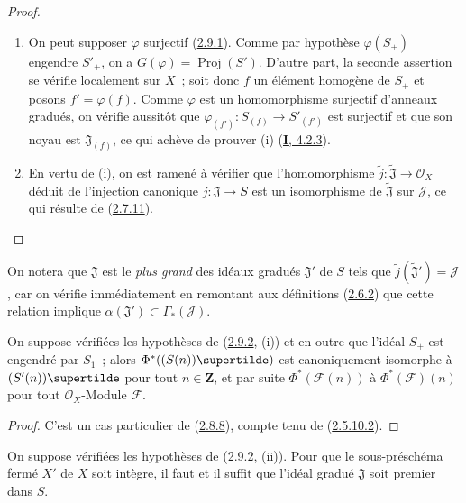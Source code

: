 \begin{proof}
\begin{enumerate}
  \item[\rm(i)] On peut supposer $\varphi$ surjectif
    (\hyperref[II.2.9.1-fr]{2.9.1}). Comme par hypothèse
    $\varphi(S_+)$ engendre $S'_+$, on a
    $G(\varphi)=\operatorname{Proj}(S')$. D'autre part, la seconde assertion
    se vérifie localement sur $X$~; soit donc $f$ un élément homogène de
    $S_+$ et posons $f'=\varphi(f)$. Comme $\varphi$ est un homomorphisme
    surjectif d'anneaux gradués, on vérifie aussitôt que
    $\varphi_{(f')}:S_{(f)}\to S'_{(f')}$ est surjectif et que son noyau est
    $\mathfrak{J}_{(f)}$, ce qui achève de prouver (i)
    (\hyperref[I.4.2.3-fr]{\textbf{I}, 4.2.3}).
  \item[\rm(ii)] En vertu de (i), on est ramené à vérifier que
    l'homomorphisme $\widetilde{j}:\widetilde{\mathfrak{J}}\to\mathcal{O}_X$
    déduit de l'injection canonique $j:\mathfrak{J}\to S$ est un
    isomorphisme de $\widetilde{\mathfrak{J}}$ sur $\mathcal{J}$, ce qui
    résulte de (\hyperref[II.2.7.11-fr]{2.7.11}).
\end{enumerate}
\end{proof}

On notera que $\mathfrak{J}$ est le \emph{plus grand} des idéaux gradués
$\mathfrak{J}'$ de $S$ tels que
$\widetilde{j}(\widetilde{\mathfrak{J}}')=\mathcal{J}$, car on vérifie
immédiatement en remontant aux définitions
(\hyperref[II.2.6.2-fr]{2.6.2}) que cette relation implique
$\alpha(\mathfrak{J}')\subset\Gamma_*(\mathcal{J})$.

\begin{corollary}[2.9.3]
\label{II.2.9.3-fr}
On suppose vérifiées les hypothèses de
\textup{(\hyperref[II.2.9.2-fr]{2.9.2}, (i))} et en outre que l'idéal $S_+$ est
engendré par $S_1$~; alors $\Phi^*((S(n))\supertilde)$ est canoniquement
isomorphe à $(S'(n))\supertilde$ pour tout $n\in\mathbf{Z}$, et par suite
$\Phi^*(\mathcal{F}(n))$ à $\Phi^*(\mathcal{F})(n)$ pour tout
$\mathcal{O}_X$-Module $\mathcal{F}$.
\end{corollary}

\begin{proof}
C'est un cas particulier de (\hyperref[II.2.8.8-fr]{2.8.8}), compte tenu de
(\hyperref[II.2.5.10.2-fr]{2.5.10.2}).
\end{proof}

\begin{corollary}[2.9.4]
\label{II.2.9.4-fr}
On suppose vérifiées les hypothèses de
\textup{(\hyperref[II.2.9.2-fr]{2.9.2}, (ii))}. Pour que le sous-préschéma fermé $X'$
de $X$ soit intègre, il faut et il suffit que l'idéal gradué
$\mathfrak{J}$ soit premier dans $S$.
\end{corollary}

